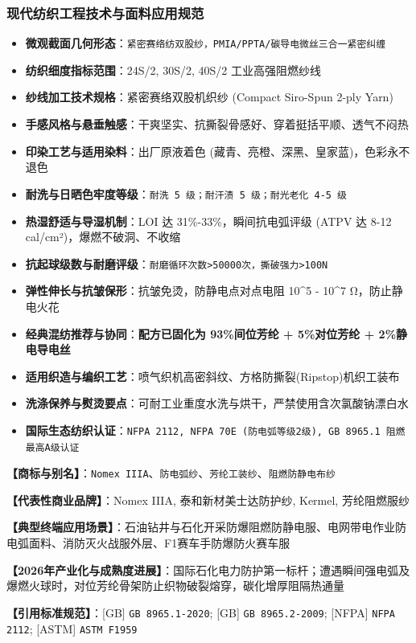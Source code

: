 \documentclass[11pt,openright,twoside,UTF8]{ctexbook}
\begin{document}
\subsubsection*{现代纺织工程技术与面料应用规范}
\begin{itemize} \setlength{\itemsep}{2pt}
    \item \textbf{微观截面几何形态}：\texttt{紧密赛络纺双股纱，PMIA/PPTA/碳导电微丝三合一紧密纠缠}
    \item \textbf{纺织细度指标范围}：24S/2, 30S/2, 40S/2 工业高强阻燃纱线
    \item \textbf{纱线加工技术规格}：紧密赛络双股机织纱 (Compact Siro-Spun 2-ply Yarn)
    \item \textbf{手感风格与悬垂触感}：干爽坚实、抗撕裂骨感好、穿着挺括平顺、透气不闷热
    \item \textbf{印染工艺与适用染料}：出厂原液着色 (藏青、亮橙、深黑、皇家蓝)，色彩永不退色
    \item \textbf{耐洗与日晒色牢度等级}：\texttt{耐洗 5 级；耐汗渍 5 级；耐光老化 4-5 级}
    \item \textbf{热湿舒适与导湿机制}：LOI 达 31\%-33\%，瞬间抗电弧评级 (ATPV 达 8-12 cal/cm²)，爆燃不破洞、不收缩
    \item \textbf{抗起球级数与耐磨评级}：\texttt{耐磨循环次数\textgreater{}50000次，撕破强力\textgreater{}100N}
    \item \textbf{弹性伸长与抗皱保形}：抗皱免烫，防静电点对点电阻 10\textasciicircum{}5 - 10\textasciicircum{}7 Ω，防止静电火花
    \item \textbf{经典混纺推荐与协同}：\textbf{配方已固化为 93\%间位芳纶 + 5\%对位芳纶 + 2\%静电导电丝}
    \item \textbf{适用织造与编织工艺}：喷气织机高密斜纹、方格防撕裂(Ripstop)机织工装布
    \item \textbf{洗涤保养与熨烫要点}：可耐工业重度水洗与烘干，严禁使用含次氯酸钠漂白水
    \item \textbf{国际生态纺织认证}：\texttt{NFPA 2112, NFPA 70E (防电弧等级2级), GB 8965.1 阻燃最高A级认证}
\end{itemize}
\vspace{0.2cm}

\noindent\textbf{【商标与别名】}：\texttt{Nomex IIIA}、\texttt{防电弧纱}、\texttt{芳纶工装纱}、\texttt{阻燃防静电布纱}\par
\noindent\textbf{【代表性商业品牌】}：Nomex IIIA, 泰和新材美士达防护纱, Kermel, 芳纶阻燃服纱\par
\noindent\textbf{【典型终端应用场景】}：石油钻井与石化开采防爆阻燃防静电服、电网带电作业防电弧面料、消防灭火战服外层、F1赛车手防爆防火赛车服\par
\noindent\textbf{【2026年产业化与成熟度进展】}：国际石化电力防护第一标杆；遭遇瞬间强电弧及爆燃火球时，对位芳纶骨架防止织物破裂熔穿，碳化增厚阻隔热通量\par
\noindent\textbf{【引用标准规范】}：[GB] \texttt{GB 8965.1-2020}; [GB] \texttt{GB 8965.2-2009}; [NFPA] \texttt{NFPA 2112}; [ASTM] \texttt{ASTM F1959}\par
\vspace{0.5cm}
\end{document}
